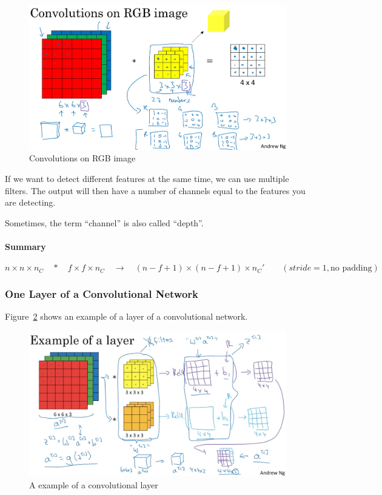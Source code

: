 \documentclass[UTF8]{article}
\begin{document}
\begin{figure}[htb]
    \centering
    \includegraphics[width=40em]{figures/convolutions-on-rgb-image}
    \caption{Convolutions on RGB image}
    \label{fig:convolutions-on-rgb-image}
\end{figure}

If we want to detect different features at the same time, we can use multiple filters. The output
will then have a number of channels equal to the features you are detecting.

Sometimes, the term ``channel'' is also called ``depth''.

\paragraph{Summary}
$$ n \times n \times n_C \quad * \quad f \times f \times n_C \quad \rightarrow \quad
(n-f+1) \times (n-f+1) \times n_C' \qquad (stride = 1, \text{no padding})$$

\subsubsection{One Layer of a Convolutional Network}
Figure~\ref{fig:example-of-a-conv-layer} shows an example of a layer of a convolutional network.

\begin{figure}[htb]
    \centering
    \includegraphics[width=40em]{figures/example-of-a-conv-layer}
    \caption{A example of a convolutional layer}
    \label{fig:example-of-a-conv-layer}
\end{figure}
\end{document}
